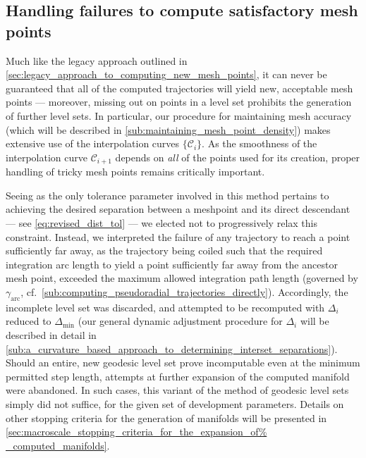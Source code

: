 \subsection{Handling failures to compute satisfactory mesh points}
\label{sub:handling_failures_to_compute_satisfactory_mesh_points_revised}

Much like the legacy approach outlined in
\cref{sec:legacy_approach_to_computing_new_mesh_points}, it can never be
guaranteed that all of the computed trajectories will yield new, acceptable
mesh points --- moreover, missing out on points in a level set prohibits
the generation of further level sets. In particular, our procedure for
maintaining mesh accuracy (which will be described in
\cref{sub:maintaining_mesh_point_density}) makes extensive use of the
interpolation curves $\{\mathcal{C}_{i}\}$. As the smoothness of the
interpolation curve $\mathcal{C}_{i+1}$ depends on \emph{all} of the points
used for its creation, proper handling of tricky mesh points remains critically
important.

Seeing as the only tolerance parameter involved in this method pertains to
achieving the desired separation between a meshpoint and its direct descendant
--- see \cref{eq:revised_dist_tol} --- we elected not to progressively relax
this constraint. Instead, we interpreted the failure of any trajectory to reach
a point sufficiently far away, as the trajectory being coiled such that the
required integration arc length to yield a point sufficiently far away from
the ancestor mesh point, exceeded the maximum allowed integration path
length (governed by $\gamma_{\text{arc}}$, cf.\
\cref{sub:computing_pseudoradial_trajectories_directly}). Accordingly, the
incomplete level set was discarded, and attempted to be recomputed with
$\Delta_{i}$ reduced to $\Delta_{\min}$ (our general dynamic adjustment
procedure for $\Delta_{i}$ will be described in detail in
\cref{sub:a_curvature_based_approach_to_determining_interset_separations}).
Should an entire, new geodesic level set prove incomputable even at the
minimum permitted step length, attempts at further expansion of the computed
manifold were abandoned. In such cases, this variant of the method of geodesic
level sets simply did not suffice, for the given set of development parameters.
Details on other stopping criteria for the generation of manifolds will be
presented in \cref{sec:macroscale_stopping_criteria_for_the_expansion_of%
_computed_manifolds}.


